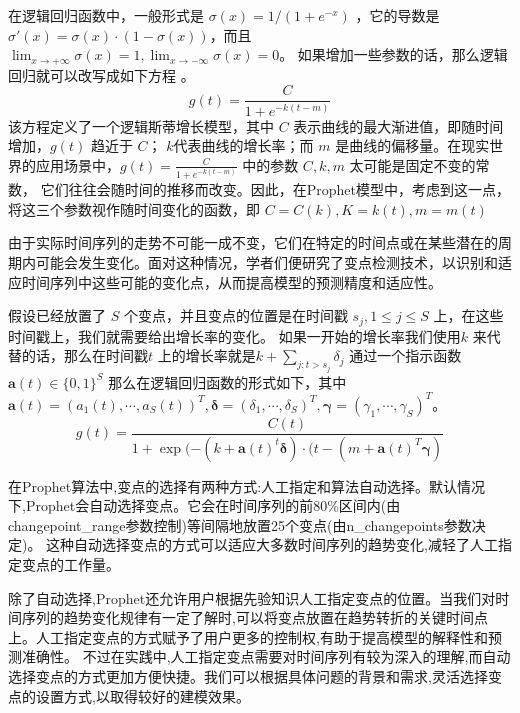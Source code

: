 在逻辑回归函数中，一般形式是 $\sigma(x) = 1/(1+e^{-x})$ ，它的导数是 $\sigma'(x) = \sigma(x) \cdot(1-\sigma(x))$，而且$\lim_{x\rightarrow +\infty} \sigma(x) = 1, \lim_{x\rightarrow -\infty} \sigma(x) = 0$。
如果增加一些参数的话，那么逻辑回归就可以改写成如下方程\cite{李威2021Prophet模型在GNSS坐标时间序列中的插值分析} 。
\begin{equation}
  g(t) = \frac{C}{1 + e^{-k(t - m)}}
\end{equation}
该方程定义了一个逻辑斯蒂增长模型，其中 $C$ 表示曲线的最大渐进值，即随时间增加，$g(t)$ 趋近于 $C$；
$k$代表曲线的增长率；而 $m$ 是曲线的偏移量。在现实世界的应用场景中，$g(t) = \frac{C}{1 + e^{-k(t - m)}}$ 中的参数 $C, k, m$ 太可能是固定不变的常数，
它们往往会随时间的推移而改变。因此，在Prophet模型中，考虑到这一点，将这三个参数视作随时间变化的函数，即 $ C = C(k), K = k(t), m = m(t)$

由于实际时间序列的走势不可能一成不变，它们在特定的时间点或在某些潜在的周期内可能会发生变化。面对这种情况，学者们便研究了变点检测技术，以识别和适应时间序列中这些可能的变化点，从而提高模型的预测精度和适应性。

假设已经放置了 $S$ 个变点，并且变点的位置是在时间戳 $s_{j}, 1\leq j\leq S$ 上，在这些时间戳上，我们就需要给出增长率的变化。
如果一开始的增长率我们使用$k$ 来代替的话，那么在时间戳$t$ 上的增长率就是$k + \sum_{j:t>s_{j}} \delta_{j}$ 通过一个指示函数 $\mathbf{a}(t)\in \{0,1\}^{S}$
那么在逻辑回归函数的形式如下，其中 $\mathbf{a}(t) = (a_{1}(t),\cdots,a_{S}(t))^{T},  \mathbf{\delta} = (\delta_{1},\cdots,\delta_{S})^{T}, \mathbf{\gamma} = (\gamma_{1},\cdots,\gamma_{S})^{T}$。
\begin{equation}
  g(t) = \frac{C(t)}{1+\exp(-(k+\mathbf{a}(t)^{t}\mathbf{\delta}) \cdot (t - (m+\mathbf{a}(t)^{T}\mathbf{\gamma})}
\end{equation}

在Prophet算法中,变点的选择有两种方式:人工指定和算法自动选择。默认情况下,Prophet会自动选择变点。它会在时间序列的前80\%区间内(由changepoint\_range参数控制)等间隔地放置25个变点(由n\_changepoints参数决定)。
这种自动选择变点的方式可以适应大多数时间序列的趋势变化,减轻了人工指定变点的工作量。

除了自动选择,Prophet还允许用户根据先验知识人工指定变点的位置。当我们对时间序列的趋势变化规律有一定了解时,可以将变点放置在趋势转折的关键时间点上。人工指定变点的方式赋予了用户更多的控制权,有助于提高模型的解释性和预测准确性。
不过在实践中,人工指定变点需要对时间序列有较为深入的理解,而自动选择变点的方式更加方便快捷。我们可以根据具体问题的背景和需求,灵活选择变点的设置方式,以取得较好的建模效果。

